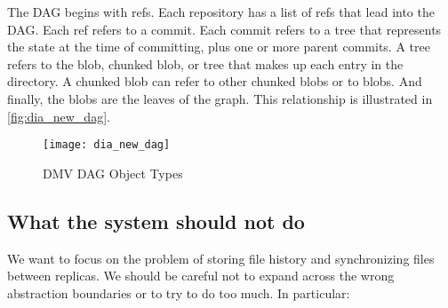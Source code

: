 The DAG begins with refs. Each repository has a list of refs that lead into the
DAG. Each ref refers to a commit. Each commit refers to a tree that represents
the state at the time of committing, plus one or more parent commits. A tree
refers to the blob, chunked blob, or tree that makes up each entry in the
directory. A chunked blob can refer to other chunked blobs or to blobs. And
finally, the blobs are the leaves of the graph. This relationship is illustrated
in \autoref{fig:dia_new_dag}.


\begin{figure}[h]
    \caption{DMV DAG Object Types}
    \label{fig:dia_new_dag}
    \centering
        \texttt{[image: dia\_new\_dag]}
\end{figure}











\subsection{What the system should not do}

We want to focus on the problem of storing file history and synchronizing files
between replicas.
We should be careful not to expand across the wrong abstraction boundaries or to
try to do too much.
In particular:

